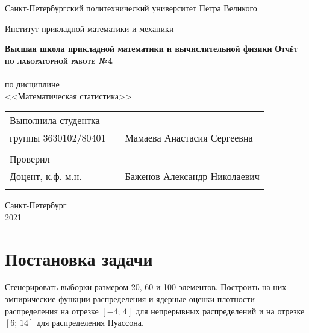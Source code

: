 \documentclass{article}
\begin{document}
\begin{titlepage}
  \begin{center}
    \large
    Санкт-Петербургский политехнический университет Петра Великого
    
    Институт прикладной математики и механики
    
    \textbf{Высшая школа прикладной математики и вычислительной физики}
    \vfill
    \textsc{\textbf{\Large{Отчёт по лабораторной работе №4}}}\\[5mm]
    \\ по дисциплине
    \\ <<Математическая статистика>>\\
\end{center}

\vfill

\begin{tabular}{l p{} l}
Выполнила студентка \\группы 3630102/80401 && Мамаева Анастасия Сергеевна \\
\\
Проверил\\Доцент, к.ф.-м.н.& \hspace{0pt} &   Баженов Александр Николаевич \\\\
\end{tabular}

\hfill \break
\hfill \break
\begin{center} Санкт-Петербург \\2021 \end{center}
\thispagestyle{empty}
\end{titlepage}
\newpage
\newpage
\begin{center}
    \setcounter{page}{2}
    \tableofcontents
\end{center}
\newpage
\begin{center}
    \setcounter{page}{3}
    \listoffigures
\end{center}

\newpage

\section {Постановка задачи}
\noindent Сгенерировать выборки размером 20, 60 и 100 элементов. Построить на них эмпирические функции распределения и ядерные оценки плотности распределения на отрезке $[-4;\,4]$ для непрерывных распределений и на отрезке $[6;\,14]$ для распределения Пуассона.
\end{document}
